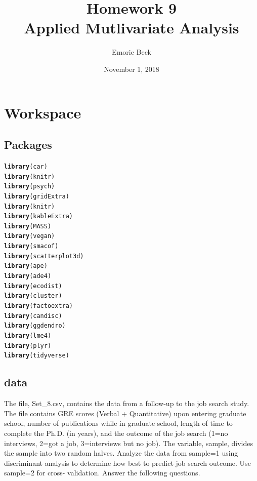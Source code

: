 \documentclass{article}\usepackage[]{graphicx}\usepackage[]{color}
\title{%
Homework 9\\
\large Applied Mutlivariate Analysis}
\date{November 1, 2018}
\author{Emorie Beck}
\makeatletter
\newcommand{\hlstd}[1]{\textcolor[rgb]{0.345,0.345,0.345}{#1}}%
\newcommand{\hlkwd}[1]{\textcolor[rgb]{0.737,0.353,0.396}{\textbf{#1}}}%
\newenvironment{kframe}{%
 \def\at@end@of@kframe{}%
 \ifinner\ifhmode%
  \def\at@end@of@kframe{\end{minipage}}%
  \begin{minipage}{\columnwidth}%
 \fi\fi%
 \def\FrameCommand##1{\hskip\@totalleftmargin \hskip-\fboxsep
 \colorbox{shadecolor}{##1}\hskip-\fboxsep
     \hskip-\linewidth \hskip-\@totalleftmargin \hskip\columnwidth}%
 \MakeFramed {\advance\hsize-\width
   \@totalleftmargin\z@ \linewidth\hsize
   \@setminipage}}%
 {\par\unskip\endMakeFramed%
 \at@end@of@kframe}
\newenvironment{knitrout}{}{} %
\makeatother
\begin{document}
\maketitle

\section{Workspace}
\subsection{Packages}



\begin{knitrout}
\color{fgcolor}\begin{kframe}
\begin{alltt}
\hlkwd{library}\hlstd{(car)}
\hlkwd{library}\hlstd{(knitr)}
\hlkwd{library}\hlstd{(psych)}
\hlkwd{library}\hlstd{(gridExtra)}
\hlkwd{library}\hlstd{(knitr)}
\hlkwd{library}\hlstd{(kableExtra)}
\hlkwd{library}\hlstd{(MASS)}
\hlkwd{library}\hlstd{(vegan)}
\hlkwd{library}\hlstd{(smacof)}
\hlkwd{library}\hlstd{(scatterplot3d)}
\hlkwd{library}\hlstd{(ape)}
\hlkwd{library}\hlstd{(ade4)}
\hlkwd{library}\hlstd{(ecodist)}
\hlkwd{library}\hlstd{(cluster)}
\hlkwd{library}\hlstd{(factoextra)}
\hlkwd{library}\hlstd{(candisc)}
\hlkwd{library}\hlstd{(ggdendro)}
\hlkwd{library}\hlstd{(lme4)}
\hlkwd{library}\hlstd{(plyr)}
\hlkwd{library}\hlstd{(tidyverse)}
\end{alltt}
\end{kframe}
\end{knitrout}



\subsection{data}
The file, Set\_8.csv, contains the data from a follow-up to the job search study. The file contains GRE scores (Verbal + Quantitative) upon entering graduate school, number of publications while in graduate school, length of time to complete the Ph.D. (in years), and the outcome of the job search (1=no interviews, 2=got a job, 3=interviews but no job). The variable, sample, divides the sample into two random halves. Analyze the data from sample=1 using discriminant analysis to determine how best to predict job search outcome. Use sample=2 for cross- validation. Answer the following questions.
\end{document}
